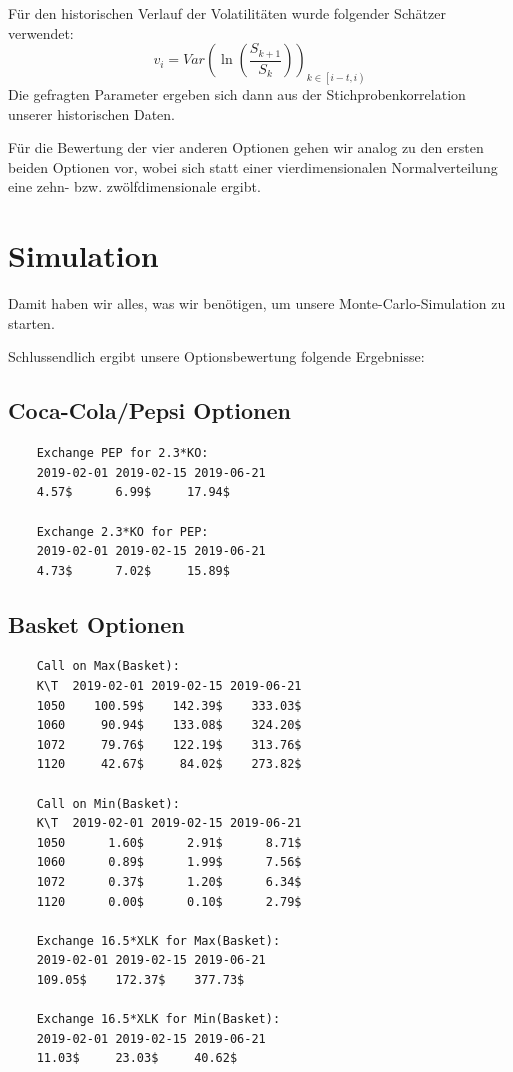 \documentclass[12pt]{article}
\begin{document}
	Für den historischen Verlauf der Volatilitäten wurde folgender Schätzer verwendet:
	\begin{equation*}
	v_i=Var\left(\ln\left(\frac{S_{k+1}}{S_k}\right)\right)_{k\in\left[i-t,i\right)}
	\end{equation*}
	Die gefragten Parameter ergeben sich dann aus der Stichprobenkorrelation unserer historischen Daten.
	
	Für die Bewertung der vier anderen Optionen gehen wir analog zu den ersten beiden Optionen vor, wobei sich statt einer vierdimensionalen Normalverteilung eine zehn- bzw. zwölfdimensionale ergibt.
	
	
	
	\section*{Simulation}
	
	Damit haben wir alles, was wir benötigen, um unsere Monte-Carlo-Simulation zu starten.
	
	
	
	Schlussendlich ergibt unsere Optionsbewertung folgende Ergebnisse:
	\subsection*{Coca-Cola/Pepsi Optionen}
	
	\begin{verbatim}
	Exchange PEP for 2.3*KO:
	2019-02-01 2019-02-15 2019-06-21
	4.57$      6.99$     17.94$ 
	
	Exchange 2.3*KO for PEP:
	2019-02-01 2019-02-15 2019-06-21
	4.73$      7.02$     15.89$
	\end{verbatim}
	
	
	\subsection*{Basket Optionen}
	
	
	
	\begin{verbatim}
	Call on Max(Basket):
	K\T  2019-02-01 2019-02-15 2019-06-21
	1050    100.59$    142.39$    333.03$ 
	1060     90.94$    133.08$    324.20$ 
	1072     79.76$    122.19$    313.76$ 
	1120     42.67$     84.02$    273.82$ 
	
	Call on Min(Basket):
	K\T  2019-02-01 2019-02-15 2019-06-21
	1050      1.60$      2.91$      8.71$ 
	1060      0.89$      1.99$      7.56$ 
	1072      0.37$      1.20$      6.34$ 
	1120      0.00$      0.10$      2.79$ 
	
	Exchange 16.5*XLK for Max(Basket):
	2019-02-01 2019-02-15 2019-06-21
	109.05$    172.37$    377.73$ 
	
	Exchange 16.5*XLK for Min(Basket):
	2019-02-01 2019-02-15 2019-06-21
	11.03$     23.03$     40.62$ 
	\end{verbatim}
\end{document}

